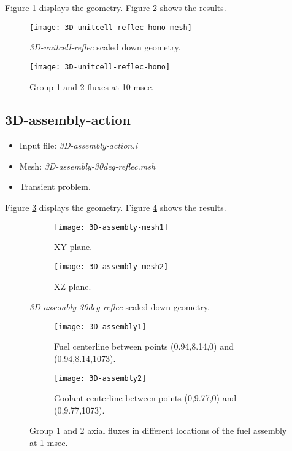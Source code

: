 \documentclass[11pt,letterpaper]{article}
\begin{document}
Figure \ref{fig:3D-unitcell-reflec-homo} displays the geometry.
Figure \ref{fig:3D-unitcell-reflec-homo1} shows the results.

	\begin{figure}[htbp!]
		\centering
		\texttt{[image: 3D-unitcell-reflec-homo-mesh]}
		\caption{\textit{3D-unitcell-reflec} scaled down geometry.}
		\label{fig:3D-unitcell-reflec-homo}
	\end{figure}

	\begin{figure}[htbp!]
		\centering
		\texttt{[image: 3D-unitcell-reflec-homo]}
		\caption{Group 1 and 2 fluxes at 10 msec.}
		\label{fig:3D-unitcell-reflec-homo1}
	\end{figure}





\subsection{3D-assembly-action}

	\begin{itemize}
		\item Input file: \textit{3D-assembly-action.i}
		\item Mesh: \textit{3D-assembly-30deg-reflec.msh}
		\item Transient problem.
	\end{itemize}

Figure \ref{fig:3D-assembly} displays the geometry.
Figure \ref{fig:3D-assembly1} shows the results.

	\begin{figure}[htbp!]
		\centering
		\begin{subfigure}[t]{0.4\textwidth}
			\centering
			\texttt{[image: 3D-assembly-mesh1]}
			\caption{XY-plane.}
		\end{subfigure}
		\begin{subfigure}[t]{0.4\textwidth}
			\centering
			\texttt{[image: 3D-assembly-mesh2]}
			\caption{XZ-plane.}
		\end{subfigure}
		\hfill
		\caption{\textit{3D-assembly-30deg-reflec} scaled down geometry.}
		\label{fig:3D-assembly}
	\end{figure}

	\begin{figure}[htbp!]
		\centering
		\begin{subfigure}[t]{0.4\textwidth}
			\centering
			\texttt{[image: 3D-assembly1]}
			\caption{Fuel centerline between points (0.94,8.14,0) and (0.94,8.14,1073).}
		\end{subfigure}
		\begin{subfigure}[t]{0.4\textwidth}
			\centering
			\texttt{[image: 3D-assembly2]}
			\caption{Coolant centerline between points (0,9.77,0) and (0,9.77,1073).}
		\end{subfigure}
		\hfill
		\caption{Group 1 and 2 axial fluxes in different locations of the fuel assembly at 1 msec.}
		\label{fig:3D-assembly1}
	\end{figure}
\end{document}
